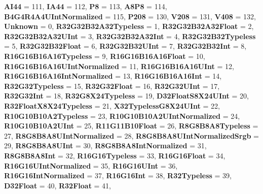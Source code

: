 \begin{DoxyCompactItemize}
{\bfseries A\+I44} = 111, 
{\bfseries I\+A44} = 112, 
{\bfseries P8} = 113, 
{\bfseries A8\+P8} = 114, 
\newline
{\bfseries B4\+G4\+R4\+A4\+U\+Int\+Normalized} = 115, 
{\bfseries P208} = 130, 
{\bfseries V208} = 131, 
{\bfseries V408} = 132, 
\newline
{\bfseries Unknown} = 0, 
{\bfseries R32\+G32\+B32\+A32\+Typeless} = 1, 
{\bfseries R32\+G32\+B32\+A32\+Float} = 2, 
{\bfseries R32\+G32\+B32\+A32\+U\+Int} = 3, 
\newline
{\bfseries R32\+G32\+B32\+A32\+Int} = 4, 
{\bfseries R32\+G32\+B32\+Typeless} = 5, 
{\bfseries R32\+G32\+B32\+Float} = 6, 
{\bfseries R32\+G32\+B32\+U\+Int} = 7, 
\newline
{\bfseries R32\+G32\+B32\+Int} = 8, 
{\bfseries R16\+G16\+B16\+A16\+Typeless} = 9, 
{\bfseries R16\+G16\+B16\+A16\+Float} = 10, 
{\bfseries R16\+G16\+B16\+A16\+U\+Int\+Normalized} = 11, 
\newline
{\bfseries R16\+G16\+B16\+A16\+U\+Int} = 12, 
{\bfseries R16\+G16\+B16\+A16\+Int\+Normalized} = 13, 
{\bfseries R16\+G16\+B16\+A16\+Int} = 14, 
{\bfseries R32\+G32\+Typeless} = 15, 
\newline
{\bfseries R32\+G32\+Float} = 16, 
{\bfseries R32\+G32\+U\+Int} = 17, 
{\bfseries R32\+G32\+Int} = 18, 
{\bfseries R32\+G8\+X24\+Typeless} = 19, 
\newline
{\bfseries D32\+Float\+S8\+X24\+U\+Int} = 20, 
{\bfseries R32\+Float\+X8\+X24\+Typeless} = 21, 
{\bfseries X32\+Typeless\+G8\+X24\+U\+Int} = 22, 
{\bfseries R10\+G10\+B10\+A2\+Typeless} = 23, 
\newline
{\bfseries R10\+G10\+B10\+A2\+U\+Int\+Normalized} = 24, 
{\bfseries R10\+G10\+B10\+A2\+U\+Int} = 25, 
{\bfseries R11\+G11\+B10\+Float} = 26, 
{\bfseries R8\+G8\+B8\+A8\+Typeless} = 27, 
\newline
{\bfseries R8\+G8\+B8\+A8\+U\+Int\+Normalized} = 28, 
{\bfseries R8\+G8\+B8\+A8\+U\+Int\+Normalized\+Srgb} = 29, 
{\bfseries R8\+G8\+B8\+A8\+U\+Int} = 30, 
{\bfseries R8\+G8\+B8\+A8\+Int\+Normalized} = 31, 
\newline
{\bfseries R8\+G8\+B8\+A8\+Int} = 32, 
{\bfseries R16\+G16\+Typeless} = 33, 
{\bfseries R16\+G16\+Float} = 34, 
{\bfseries R16\+G16\+U\+Int\+Normalized} = 35, 
\newline
{\bfseries R16\+G16\+U\+Int} = 36, 
{\bfseries R16\+G16\+Int\+Normalized} = 37, 
{\bfseries R16\+G16\+Int} = 38, 
{\bfseries R32\+Typeless} = 39, 
\newline
{\bfseries D32\+Float} = 40, 
{\bfseries R32\+Float} = 41, 

\end{DoxyCompactItemize}
